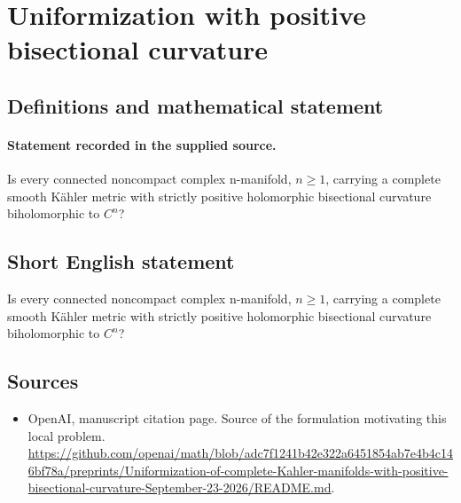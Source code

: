 \documentclass[11pt]{article}
\begin{document}
\section*{Uniformization with positive bisectional curvature}\label{30007147}
\subsection{Definitions and mathematical statement}
\paragraph{Statement recorded in the supplied source.}
Is every connected noncompact complex n-manifold, $n\geq 1$, carrying a complete smooth Kähler metric with strictly positive holomorphic bisectional curvature biholomorphic to $C^{n}$?
\subsection{Short English statement}
Is every connected noncompact complex n-manifold, $n\geq 1$, carrying a complete smooth Kähler metric with strictly positive holomorphic bisectional curvature biholomorphic to $C^{n}$?
\subsection{Sources}
\begin{itemize}
\item[S1] OpenAI, manuscript citation page. Source of the formulation motivating this local problem.
\url{https://github.com/openai/math/blob/adc7f1241b42e322a6451854ab7e4b4c146bf78a/preprints/Uniformization-of-complete-Kahler-manifolds-with-positive-bisectional-curvature-September-23-2026/README.md}.
\end{itemize}
\end{document}
